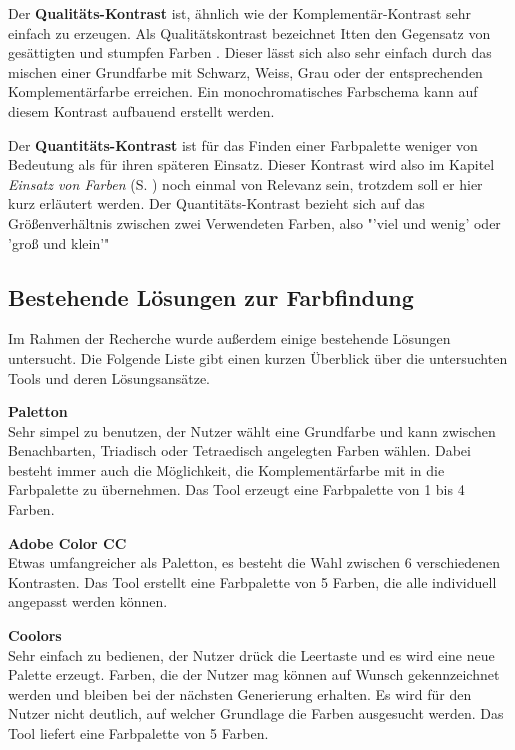 Der \textbf{Qualitäts-Kontrast} ist, ähnlich wie der Komplementär-Kontrast sehr einfach zu erzeugen. Als Qualitätskontrast bezeichnet Itten den Gegensatz von gesättigten und stumpfen Farben \cite[S. 55]{Itten201006}. Dieser lässt sich also sehr einfach durch das mischen einer Grundfarbe mit Schwarz, Weiss, Grau oder der entsprechenden Komplementärfarbe erreichen.
Ein monochromatisches Farbschema kann auf diesem Kontrast aufbauend erstellt werden.

Der \textbf{Quantitäts-Kontrast} ist für das Finden einer Farbpalette weniger von Bedeutung als für ihren späteren Einsatz. Dieser Kontrast wird also im Kapitel \textit{Einsatz von Farben} (S. \pageref{einsatz}) noch einmal von Relevanz sein, trotzdem soll er hier kurz erläutert werden. Der Quantitäts-Kontrast bezieht sich auf das Größenverhältnis zwischen zwei Verwendeten Farben, also "'viel und wenig' oder 'groß und klein'" \cite[S. 59]{Itten201006}


\subsection{Bestehende Lösungen zur Farbfindung}
Im Rahmen der Recherche wurde außerdem einige bestehende Lösungen untersucht. Die Folgende Liste gibt einen kurzen Überblick über die untersuchten Tools und deren Lösungsansätze.

\textbf{Paletton} \\
Sehr simpel zu benutzen, der Nutzer wählt eine Grundfarbe und kann zwischen Benachbarten, Triadisch oder Tetraedisch angelegten Farben wählen. Dabei besteht immer auch die Möglichkeit, die Komplementärfarbe mit in die Farbpalette zu übernehmen. Das Tool erzeugt eine Farbpalette von 1 bis 4 Farben.

\textbf{Adobe Color CC} \\
Etwas umfangreicher als Paletton, es besteht die Wahl zwischen 6 verschiedenen Kontrasten. Das Tool erstellt eine Farbpalette von 5 Farben, die alle individuell angepasst werden können.

\textbf{Coolors} \\
Sehr einfach zu bedienen, der Nutzer drück die Leertaste und es wird eine neue Palette erzeugt. Farben, die der Nutzer mag können auf Wunsch gekennzeichnet werden und bleiben bei der nächsten Generierung erhalten. Es wird für den Nutzer nicht deutlich, auf welcher Grundlage die Farben ausgesucht werden. Das Tool liefert eine Farbpalette von 5 Farben.

